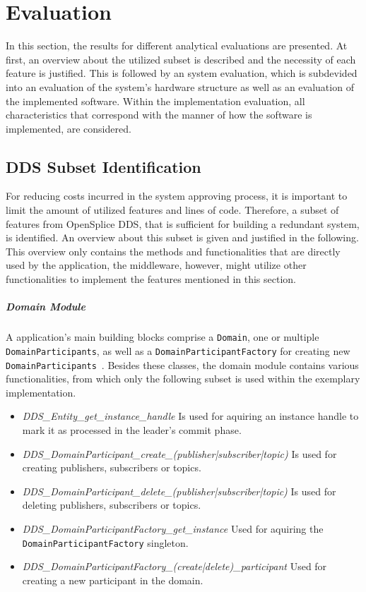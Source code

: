 \chapter{Evaluation}
\label{cpt:evaluation}
In this section, the results for different analytical evaluations are presented.
At first, an overview about the utilized  subset is described and the necessity of each feature is justified.
This is followed by an system evaluation, which is subdevided into an evaluation of the system's hardware structure as well as an evaluation of the implemented software.
Within the implementation evaluation, all characteristics that correspond with the manner of how the software is implemented, are considered.

\section{DDS Subset Identification}

For reducing costs incurred in the system approving process, it is important to limit the amount of utilized features and lines of code.
Therefore, a subset of  features from OpenSplice DDS, that is sufficient for building a redundant system, is identified.
An overview about this subset is given and justified in the following.
This overview only contains the methods and functionalities that are directly used by the application, the middleware, however, might utilize other functionalities to implement the features mentioned in this section.

\paragraph{Domain Module}
A  application's main building blocks comprise a \texttt{Domain}, one or multiple \texttt{DomainParticipants}, as well as a \texttt{DomainParticipantFactory} for creating new \texttt{DomainParticipants}~\cite{omgDDSspec}.
Besides these classes, the domain module contains various functionalities, from which only the following subset is used within the exemplary implementation.

\begin{itemize}
\item \textit{DDS\_Entity\_get\_instance\_handle} Is used for aquiring an instance handle to mark it as processed in the leader's commit phase.
\item \textit{DDS\_DomainParticipant\_create\_(publisher|subscriber|topic)} Is used for creating  publishers, subscribers or topics.
\item \textit{DDS\_DomainParticipant\_delete\_(publisher|subscriber|topic)} Is used for deleting  publishers, subscribers or topics.
\item \textit{DDS\_DomainParticipantFactory\_get\_instance} Used for aquiring the \texttt{DomainParticipantFactory} singleton.
\item \textit{DDS\_DomainParticipantFactory\_(create|delete)\_participant} Used for creating a new participant in the  domain.
\end{itemize}

